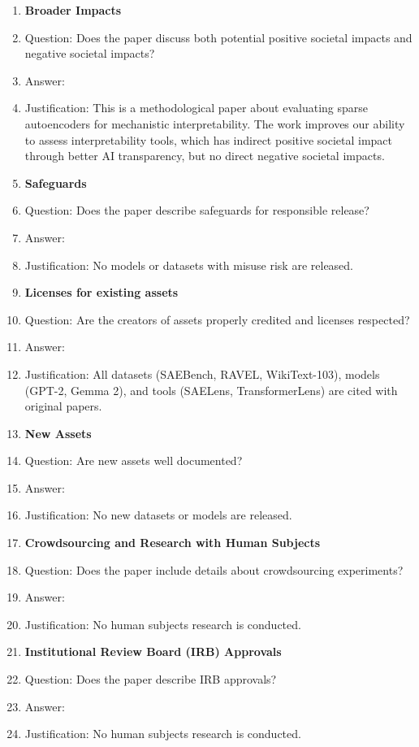 \documentclass{article}
\begin{document}
\begin{enumerate}
\item {\bf Broader Impacts}
    \item[] Question: Does the paper discuss both potential positive societal impacts and negative societal impacts?
    \item[] Answer: \answerNA{}
    \item[] Justification: This is a methodological paper about evaluating sparse autoencoders for mechanistic interpretability. The work improves our ability to assess interpretability tools, which has indirect positive societal impact through better AI transparency, but no direct negative societal impacts.

\item {\bf Safeguards}
    \item[] Question: Does the paper describe safeguards for responsible release?
    \item[] Answer: \answerNA{}
    \item[] Justification: No models or datasets with misuse risk are released.

\item {\bf Licenses for existing assets}
    \item[] Question: Are the creators of assets properly credited and licenses respected?
    \item[] Answer: \answerYes{}
    \item[] Justification: All datasets (SAEBench, RAVEL, WikiText-103), models (GPT-2, Gemma 2), and tools (SAELens, TransformerLens) are cited with original papers.

\item {\bf New Assets}
    \item[] Question: Are new assets well documented?
    \item[] Answer: \answerNA{}
    \item[] Justification: No new datasets or models are released.

\item {\bf Crowdsourcing and Research with Human Subjects}
    \item[] Question: Does the paper include details about crowdsourcing experiments?
    \item[] Answer: \answerNA{}
    \item[] Justification: No human subjects research is conducted.

\item {\bf Institutional Review Board (IRB) Approvals}
    \item[] Question: Does the paper describe IRB approvals?
    \item[] Answer: \answerNA{}
    \item[] Justification: No human subjects research is conducted.

\end{enumerate}
\end{document}
